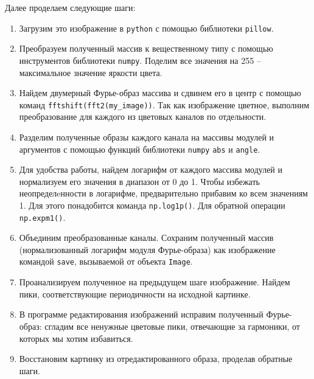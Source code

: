 \documentclass[a4paper, 12pt]{article}
\begin{document}
    Далее проделаем следующие шаги:
    \begin{enumerate}
        \item Загрузим это изображение в \texttt{python} с помощью библиотеки \texttt{pillow}.
        \item Преобразуем полученный массив к вещественному типу с помощью инструментов библиотеки \texttt{numpy}.
        Поделим все значения на 255 -- максимальное значение яркости цвета.
        \item Найдем двумерный Фурье-образ массива и сдвинем его в центр с помощью команд \texttt{fftshift(fft2(my\_image))}.
        Так как изображение цветное, выполним преобразование для каждого из цветовых каналов по отдельности.
        \item Разделим полученные образы каждого канала на массивы модулей и аргументов с помощью функций библиотеки \texttt{numpy} \texttt{abs} и \texttt{angle}.
        \item Для удобства работы, найдем логарифм от каждого массива модулей и нормализуем его
        значения в диапазон от 0 до 1. Чтобы избежать неопределeнности в логарифме,
        предварительно прибавим ко всем значениям 1. Для этого понадобится команда \texttt{np.log1p()}. Для обратной операции \texttt{np.expm1()}.
        \item Объединим преобразованные каналы. Сохраним полученный массив (нормализованный логарифм модуля Фурье-образа)
        как изображение командой \texttt{save}, вызываемой от объекта \texttt{Image}.
        \item Проанализируем полученное на предыдущем шаге изображение. Найдем пики,
        соответствующие периодичности на исходной картинке.
        \item В программе редактирования изображений исправим полученный Фурье-образ: сгладим все ненужные цветовые пики, отвечающие за
        гармоники, от которых мы хотим избавиться.
        \item Восстановим картинку из отредактированного образа, проделав обратные шаги.  
    \end{enumerate}
    
\end{document}
